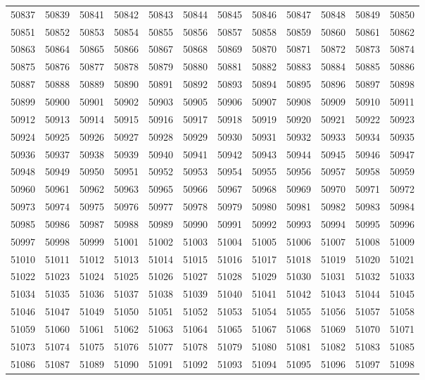 \begin{center}
\begin{longtable}{llllllllllll}
50837 &50839 &50841 &50842 &50843 &50844 &50845 &50846 &50847 &50848 &50849 &50850 \\
50851 &50852 &50853 &50854 &50855 &50856 &50857 &50858 &50859 &50860 &50861 &50862 \\
50863 &50864 &50865 &50866 &50867 &50868 &50869 &50870 &50871 &50872 &50873 &50874 \\
50875 &50876 &50877 &50878 &50879 &50880 &50881 &50882 &50883 &50884 &50885 &50886 \\
50887 &50888 &50889 &50890 &50891 &50892 &50893 &50894 &50895 &50896 &50897 &50898 \\
50899 &50900 &50901 &50902 &50903 &50905 &50906 &50907 &50908 &50909 &50910 &50911 \\
50912 &50913 &50914 &50915 &50916 &50917 &50918 &50919 &50920 &50921 &50922 &50923 \\
50924 &50925 &50926 &50927 &50928 &50929 &50930 &50931 &50932 &50933 &50934 &50935 \\
50936 &50937 &50938 &50939 &50940 &50941 &50942 &50943 &50944 &50945 &50946 &50947 \\
50948 &50949 &50950 &50951 &50952 &50953 &50954 &50955 &50956 &50957 &50958 &50959 \\
50960 &50961 &50962 &50963 &50965 &50966 &50967 &50968 &50969 &50970 &50971 &50972 \\
50973 &50974 &50975 &50976 &50977 &50978 &50979 &50980 &50981 &50982 &50983 &50984 \\
50985 &50986 &50987 &50988 &50989 &50990 &50991 &50992 &50993 &50994 &50995 &50996 \\
50997 &50998 &50999 &51001 &51002 &51003 &51004 &51005 &51006 &51007 &51008 &51009 \\
51010 &51011 &51012 &51013 &51014 &51015 &51016 &51017 &51018 &51019 &51020 &51021 \\
51022 &51023 &51024 &51025 &51026 &51027 &51028 &51029 &51030 &51031 &51032 &51033 \\
51034 &51035 &51036 &51037 &51038 &51039 &51040 &51041 &51042 &51043 &51044 &51045 \\
51046 &51047 &51049 &51050 &51051 &51052 &51053 &51054 &51055 &51056 &51057 &51058 \\
51059 &51060 &51061 &51062 &51063 &51064 &51065 &51067 &51068 &51069 &51070 &51071 \\
51073 &51074 &51075 &51076 &51077 &51078 &51079 &51080 &51081 &51082 &51083 &51085 \\
51086 &51087 &51089 &51090 &51091 &51092 &51093 &51094 &51095 &51096 &51097 &51098 \\

\end{longtable}
\end{center}
